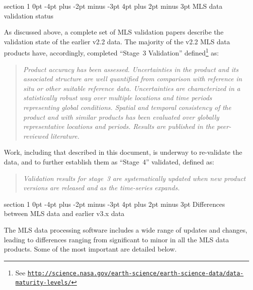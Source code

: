 \documentclass[11pt,draft]{report}
\makeatletter
\renewcommand{\section}{\@startsection%
  {section}%
  {1}%
  {0pt}%
  {-4pt plus -2pt minus -3pt}%
  {4pt plus 2pt minus 3pt}%
  {\Large\sffamily\fontseries{sb}\selectfont\flushleft\color{SectionColor}\figureversion{tabular}}}%
\makeatother
\begin{document}
\section{MLS data validation status}

As discussed above, a complete set of MLS validation papers describe the
validation state of the earlier v2.2 data.  The majority of the v2.2 MLS
data products have, accordingly, completed ``Stage~3 Validation''
defined\footnote{See
  \href{http://science.nasa.gov/earth-science/earth-science-data/data-maturity-levels/}%
  {\texttt{http://science.nasa.gov/earth-science/earth-science-data/data-maturity-levels/}}}
as:
\begin{quote}\itshape
  Product accuracy has been assessed.  Uncertainties in the product and
  its associated structure are well quantified from comparison with
  reference in situ or other suitable reference data. Uncertainties are
  characterized in a statistically robust way over multiple locations
  and time periods representing global conditions.  Spatial and temporal
  consistency of the product and with similar products has been
  evaluated over globally representative locations and periods.  Results
  are published in the peer-reviewed literature.
\end{quote}
Work, including that described in this document, is underway to
re-validate the \thisv data, and to further establish them as ``Stage~4''
validated, defined as:
\begin{quote}\itshape
  Validation results for stage~3 are systematically updated when new
  product versions are released and as the time-series expands.
\end{quote}

\section{Differences between MLS \thisv data and earlier v3.x data}
\label{sec:V4vsV3Overview}

The MLS \thisv data processing software includes a wide range of updates
and changes, leading to differences ranging from significant to minor in
all the MLS data products.  Some of the most important are detailed
below.
\end{document}
